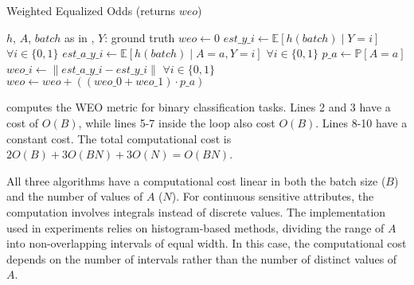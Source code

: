 \begin{algorithm}
    \caption{Weighted Equalized Odds (returns $weo$)}
    \label{alg:weo}
    \begin{algorithmic}[1]
        \REQUIRE $h$, $A$, $batch$ \hfill as in , \hfill $Y$: ground truth
        \STATE $weo \leftarrow 0$
        \STATE $est\_y\_i \leftarrow \mathbb{E}[h(batch) \mid Y = i]$ \hfill \(\forall i \in \{0, 1\}\)
            \STATE $est\_a\_y\_i \leftarrow \mathbb{E}[h(batch) \mid A = a, Y = i]$ \hfill \(\forall i \in \{0, 1\}\)
            \STATE $p\_a \leftarrow \mathbb{P}[A = a]$
            \STATE $weo\_i \leftarrow \| est\_a\_y\_i - est\_y\_i \|$ \hfill \(\forall i \in \{0, 1\}\)
            \STATE $weo \leftarrow weo + \left( (weo\_0 + weo\_1) \cdot p\_a \right)$
        \ENDFOR
    \end{algorithmic}
\end{algorithm}

%
 computes the \gls{WEO} metric for binary classification tasks.
%
Lines 2 and 3 have a cost of \(O(B)\), while lines 5-7 inside the loop also cost \(O(B)\).
%
Lines 8-10 have a constant cost.
%
The total computational cost is \(2O(B) + 3O(BN) + 3O(N) = O(BN)\).

%
All three algorithms have a computational cost linear in both the batch size (\(B\)) and the number of values of \(A\) (\(N\)).
%
For continuous sensitive attributes, the computation involves integrals instead of discrete values.
%
The implementation used in experiments relies on histogram-based methods, dividing the range of \(A\) into non-overlapping intervals of equal width.
%
In this case, the computational cost depends on the number of intervals rather than the number of distinct values of \(A\).



